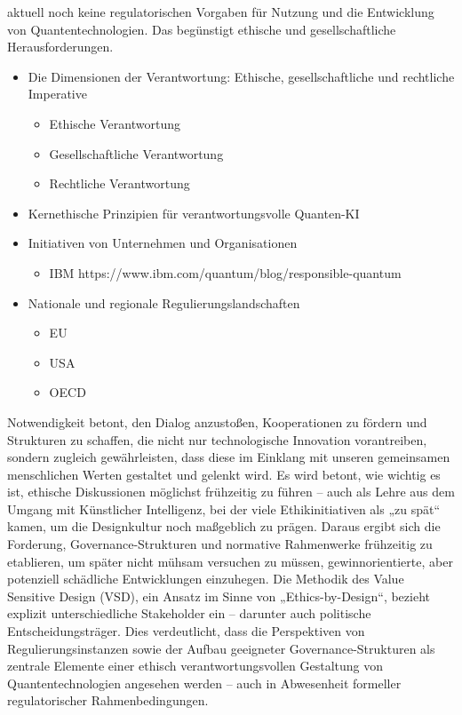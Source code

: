 {    aktuell noch keine regulatorischen Vorgaben für Nutzung und die Entwicklung von Quantentechnologien. Das begünstigt ethische und gesellschaftliche Herausforderungen. \cite{umbrello_quantum_2024} \cite{1-s2.0-S0370157324001078}
\begin{itemize}
    \item Die Dimensionen der Verantwortung: Ethische, gesellschaftliche und rechtliche Imperative
    \begin{itemize}
        \item Ethische Verantwortung
        \item Gesellschaftliche Verantwortung
        \item Rechtliche Verantwortung
    \end{itemize}
\item Kernethische Prinzipien für verantwortungsvolle Quanten-KI
\item Initiativen von Unternehmen und Organisationen
\begin{itemize}
    \item IBM https://www.ibm.com/quantum/blog/responsible-quantum
\end{itemize}
\item Nationale und regionale Regulierungslandschaften
\begin{itemize}
    \item EU
    \item USA
    \item OECD
\end{itemize}
\end{itemize}
    Notwendigkeit betont, den Dialog anzustoßen, Kooperationen zu fördern und Strukturen zu schaffen, die nicht nur technologische Innovation vorantreiben, sondern zugleich gewährleisten, dass diese im Einklang mit unseren gemeinsamen menschlichen Werten gestaltet und gelenkt wird. \cite{umbrello_quantum_2024}
    Es wird betont, wie wichtig es ist, ethische Diskussionen möglichst frühzeitig zu führen – auch als Lehre aus dem Umgang mit Künstlicher Intelligenz, bei der viele Ethikinitiativen als „zu spät“ kamen, um die Designkultur noch maßgeblich zu prägen. Daraus ergibt sich die Forderung, Governance-Strukturen und normative Rahmenwerke frühzeitig zu etablieren, um später nicht mühsam versuchen zu müssen, gewinnorientierte, aber potenziell schädliche Entwicklungen einzuhegen.\cite{1-s2.0-S0370157324001078}
    Die Methodik des Value Sensitive Design (VSD), ein Ansatz im Sinne von „Ethics-by-Design“, bezieht explizit unterschiedliche Stakeholder ein – darunter auch politische Entscheidungsträger. Dies verdeutlicht, dass die Perspektiven von Regulierungsinstanzen sowie der Aufbau geeigneter Governance-Strukturen als zentrale Elemente einer ethisch verantwortungsvollen Gestaltung von Quantentechnologien angesehen werden – auch in Abwesenheit formeller regulatorischer Rahmenbedingungen. \cite{umbrello_quantum_2024}
}
